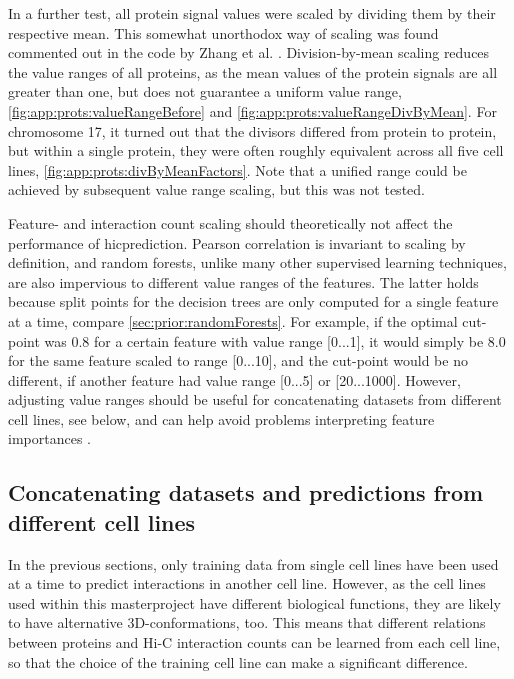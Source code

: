 In a further test, all protein signal values were scaled by dividing them by their respective mean.
This somewhat unorthodox way of scaling was found commented out in the code by Zhang et al. \cite{Roy2020}.
Division-by-mean scaling reduces the value ranges of all proteins, 
as the mean values of the protein signals are all greater than one,
but does not guarantee a uniform value range, 
\autoref{fig:app:prots:valueRangeBefore} and \ref{fig:app:prots:valueRangeDivByMean}.
For chromosome 17, it turned out that the divisors differed from protein to protein, 
but within a single protein, they were often roughly equivalent across all five cell lines, \autoref{fig:app:prots:divByMeanFactors}.
Note that a unified range could be achieved by subsequent value range scaling, but this was not tested.

Feature- and interaction count scaling should theoretically not affect the performance of hicprediction.
Pearson correlation is invariant to scaling by definition,
and random forests, unlike many other supervised learning techniques, are also impervious to different value ranges of the features.
The latter holds because split points for the decision trees are only computed for a single feature at a time, 
compare \autoref{sec:prior:randomForests}.
For example, if the optimal cut-point was 0.8 for a certain feature with value range [0...1],
it would simply be 8.0 for the same feature scaled to range [0...10], 
and the cut-point would be no different, if another feature had value range [0...5] or [20...1000].
However, adjusting value ranges should be useful
for concatenating datasets from different cell lines, see below, and can
help avoid problems interpreting feature importances \cite{Strobl2007}.

\subsection{Concatenating datasets and predictions from different cell lines} \label{sec:improve:concatdatasets}
In the previous sections, only training data from single cell lines have been used at a time 
to predict interactions in another cell line.
However, as the cell lines used within this masterproject have different biological functions, 
they are likely to have alternative 3D-conformations, too.
This means that different relations between proteins and Hi-C interaction counts
can be learned from each cell line, so that the choice of the training cell line can make a significant difference.

